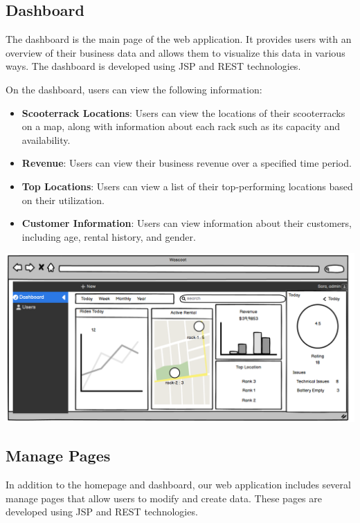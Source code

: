 \subsection{Dashboard}

The dashboard is the main page of the web application. It provides users with an overview of their business data and allows them to visualize this data in various ways. The dashboard is developed using JSP and REST technologies.

On the dashboard, users can view the following information:

\begin{itemize}
\item \textbf{Scooterrack Locations}: Users can view the locations of their scooterracks on a map, along with information about each rack such as its capacity and availability.
\item \textbf{Revenue}: Users can view their business revenue over a specified time period.
\item \textbf{Top Locations}: Users can view a list of their top-performing locations based on their utilization.
\item \textbf{Customer Information}: Users can view information about their customers, including age, rental history, and gender.
\end{itemize}

\includegraphics[scale = 0.7]{sections/DLL/dashboard-mockup.png}

\subsection{Manage Pages}

In addition to the homepage and dashboard, our web application includes several manage pages that allow users to modify and create data. These pages are developed using JSP and REST technologies.

